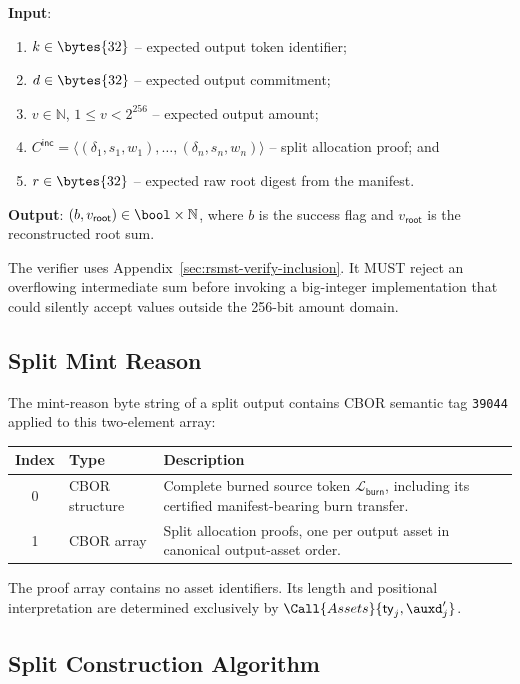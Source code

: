 \textbf{Input}:
\begin{enumerate}
	\item $k \in \bytes{32}$ -- expected output token identifier;
	\item $d \in \bytes{32}$ -- expected output commitment;
	\item $v \in \mathbb{N}$, $1\leq v<2^{256}$ -- expected output amount;
	\item $C^\mathsf{inc}=\langle(\delta_1,s_1,w_1),\ldots,(\delta_n,s_n,w_n)\rangle$ -- split allocation proof; and
	\item $r \in \bytes{32}$ -- expected raw root digest from the manifest.
\end{enumerate}

\textbf{Output}: $(b,v_\mathsf{root}) \in \bool\times\mathbb{N}$, where $b$ is the success flag and $v_\mathsf{root}$ is the reconstructed root sum.

The verifier uses Appendix~\ref{sec:rsmst-verify-inclusion}.  It MUST reject an overflowing intermediate sum before invoking a big-integer implementation that could silently accept values outside the 256-bit amount domain.

\subsection{Split Mint Reason}\label{app:split-mint-reason}

The mint-reason byte string of a split output contains CBOR semantic tag \texttt{39044} applied to this two-element array:

\begin{longtable}{clp{9cm}}
\textbf{Index} & \textbf{Type} & \textbf{Description} \\
\hline
0 & CBOR structure & Complete burned source token $\mathcal{L}_\mathsf{burn}$, including its certified manifest-bearing burn transfer. \\
1 & CBOR array & Split allocation proofs, one per output asset in canonical output-asset order. \\
\end{longtable}

The proof array contains no asset identifiers. Its length and positional interpretation are determined exclusively by $\Call{Assets}{\mathsf{ty}_j,\auxd'_j}$.

\subsection{Split Construction Algorithm}\label{app:split-construction}

